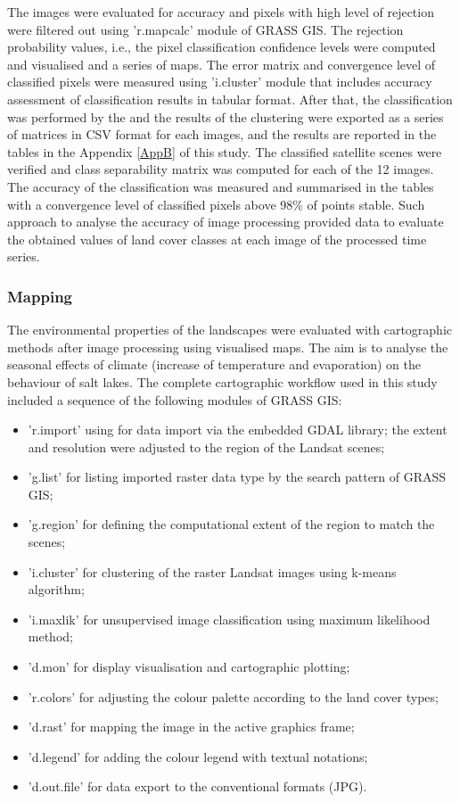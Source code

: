 \documentclass[land,article,submit,pdftex,moreauthors]{Definitions/mdpi}
\begin{document}
The images were evaluated for accuracy and pixels with high level of rejection were filtered out using 'r.mapcalc' module of GRASS GIS. The rejection probability values, i.e., the pixel classification confidence levels were computed and visualised and a series of maps. The error matrix and  convergence level of classified pixels were measured using 'i.cluster' module that includes accuracy assessment of classification results in tabular format. After that, the classification was performed by the and the results of the clustering were exported as a series of matrices in CSV format for each images, and the results are reported in the tables in the Appendix \ref{AppB} of this study. The classified satellite scenes were verified and class separability matrix was computed for each of the 12 images. The accuracy of the classification was measured and summarised in the tables with a convergence level of classified pixels above 98\% of points stable. Such approach to analyse the accuracy of image processing provided data to evaluate the obtained values of land cover classes at each image of the processed time series.
 
 \subsubsection{Mapping}

The environmental properties of the landscapes were evaluated with cartographic methods after image processing using visualised maps. The aim is to analyse the seasonal effects of climate (increase of temperature and evaporation) on the behaviour of salt lakes. The complete cartographic workflow used in this study included a sequence of the following modules of GRASS GIS:

\begin{itemize}
	\item 'r.import' using for data import via the embedded GDAL library; the extent and resolution were adjusted to the region of the Landsat scenes;
	\item 'g.list' for listing imported raster data type by the search pattern of GRASS GIS; 
	\item 'g.region' for defining the computational extent of the region to match the scenes; 
	\item 'i.cluster' for clustering of the raster Landsat images using k-means algorithm; 
	\item 'i.maxlik' for unsupervised image classification using maximum likelihood method; 
	\item 'd.mon' for display visualisation and cartographic plotting; 
	\item 'r.colors' for adjusting the colour palette according to the land cover types; 
	\item 'd.rast' for mapping the image in the active graphics frame; 
	\item 'd.legend' for adding the colour legend with textual notations; 
	\item 'd.out.file' for data export to the conventional formats (JPG). 
\end{itemize}
\end{document}
